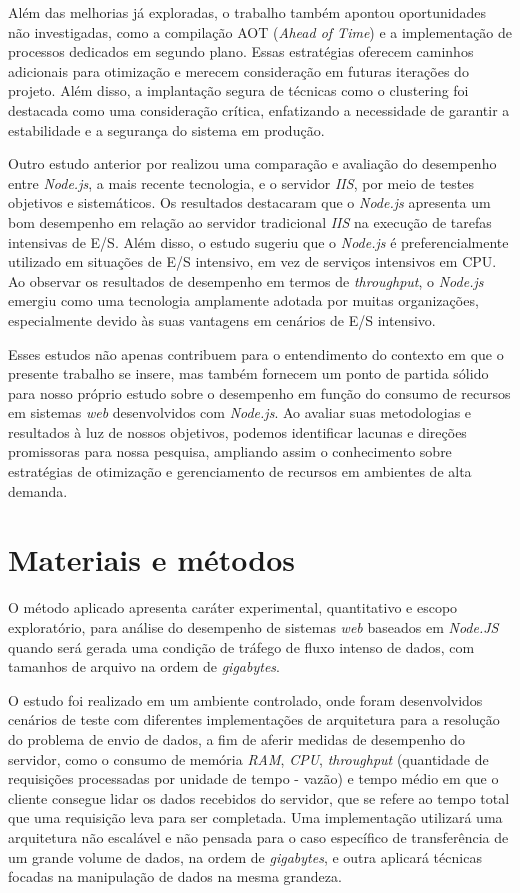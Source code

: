 \documentclass[12pt]{article}
\begin{document}
Além das melhorias já exploradas, o trabalho também apontou oportunidades não 
investigadas, como a compilação AOT (\textit{Ahead of Time}) e a implementação de processos dedicados em segundo 
plano. Essas estratégias oferecem caminhos adicionais para otimização e merecem consideração em futuras 
iterações do projeto. Além disso, a implantação segura de técnicas como o clustering foi destacada como uma 
consideração crítica, enfatizando a necessidade de garantir a estabilidade e a segurança do sistema em produção.

Outro estudo anterior por \cite{NODEJVERSUSIIS} realizou uma comparação e avaliação do desempenho entre \textit{Node.js}, a mais recente 
tecnologia, e o servidor \textit{IIS}, por meio de testes objetivos e sistemáticos. Os resultados 
destacaram que o \textit{Node.js} apresenta um bom desempenho em relação ao servidor tradicional \textit{IIS} na 
execução de tarefas intensivas de E/S. Além disso, o estudo sugeriu que o \textit{Node.js} é preferencialmente utilizado 
em situações de E/S intensivo, em vez de serviços intensivos em CPU. Ao observar os resultados de desempenho em 
termos de \textit{throughput}, o \textit{Node.js} emergiu como uma tecnologia amplamente adotada por muitas organizações, 
especialmente devido às suas vantagens em cenários de E/S intensivo.

Esses estudos não apenas contribuem para o entendimento do contexto em que o presente trabalho se insere, 
mas também fornecem um ponto de partida sólido para nosso próprio estudo sobre o desempenho em função 
do consumo de recursos em sistemas \textit{web} desenvolvidos com \textit{Node.js}. Ao avaliar suas metodologias e 
resultados à luz de nossos objetivos, podemos identificar lacunas e direções promissoras para nossa 
pesquisa, ampliando assim o conhecimento sobre estratégias de otimização e gerenciamento de recursos 
em ambientes de alta demanda.


\section{Materiais e métodos}

O método aplicado apresenta caráter experimental, quantitativo
e escopo exploratório, para análise do desempenho de sistemas \textit{web} baseados em \textit{Node.JS} 
quando será gerada uma condição de tráfego de fluxo intenso de dados,
com tamanhos de arquivo na ordem de \textit{gigabytes}.

O estudo foi realizado em um ambiente controlado, onde foram desenvolvidos cenários de teste com diferentes 
implementações de arquitetura para a resolução do problema de envio de dados, a fim de aferir medidas de desempenho do servidor, 
como o consumo de memória \textit{RAM}, \textit{CPU}, \textit{throughput} (quantidade de requisições processadas por unidade 
de tempo - vazão) e tempo médio em que o cliente consegue lidar os dados recebidos do servidor, que se refere ao tempo total que uma requisição leva
para ser completada. Uma implementação utilizará uma arquitetura não escalável e não 
pensada para o caso específico de transferência de um grande volume de dados, na ordem de \textit{gigabytes}, e outra aplicará técnicas focadas na 
manipulação de dados na mesma grandeza.
\end{document}
